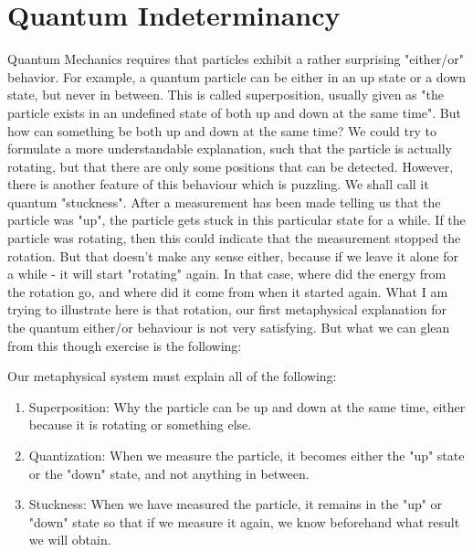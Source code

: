 \documentclass[notitlepage]{report}
\begin{document}
\section*{Quantum Indeterminancy}
Quantum Mechanics requires that particles exhibit a rather surprising "either/or" behavior.  For example, a quantum particle can be either in an up state or a down state,  but never in between. This is called superposition, usually given as "the particle exists in an undefined state of both up and down at the same time". But how can something be both up and down at the same time? We could try to formulate a more understandable explanation, such that the particle is actually rotating, but that there are only some positions that can be detected. However, there is another feature of this behaviour which is puzzling. We shall call it quantum "stuckness". After a measurement has been made telling us that the particle was "up", the particle gets stuck in this particular state for a while. If the particle was rotating, then this could indicate that the measurement stopped the rotation. But that doesn't make any sense either, because if we leave it alone for a while - it will start "rotating" again.  In that case, where did the energy from the rotation go, and where did it come from when it started again. What I am trying to illustrate here is that rotation, our first metaphysical explanation for the quantum either/or behaviour is not very satisfying. But what we can glean from this though exercise is the following:

Our metaphysical system must explain all of the following:
\begin{enumerate}
\item Superposition: Why the particle can be up and down at the same time, either because it is rotating or something else. 
\item Quantization: When we measure the particle, it becomes either the "up" state or the "down" state, and not anything in between.
\item Stuckness:  When we have measured the particle, it remains in the "up" or "down" state so that if we measure it again, we know beforehand what result we will obtain.
\end{enumerate}
\end{document}

